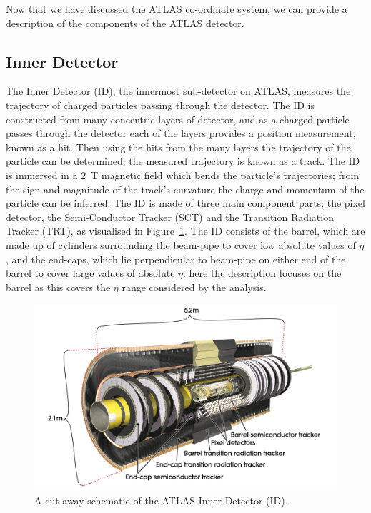Now that we have discussed the ATLAS co-ordinate system, we can provide a description of the components of the ATLAS detector.\\

\subsection{Inner Detector}
\label{sec:det-ID}

The Inner Detector (ID), the innermost sub-detector on ATLAS,
measures the trajectory of charged particles passing through the detector.
The ID is constructed from many concentric layers of detector,
and as a charged particle passes through the detector each of the layers provides a position measurement, known as a hit.
Then using the hits from the many layers the trajectory of the particle can be determined;
the measured trajectory is known as a track.
The ID is immersed in a 2~T magnetic field which bends the particle's trajectories;
from the sign and magnitude of the track's curvature the charge and momentum of the particle can be inferred.
The ID is made of three main component parts; the pixel detector, the Semi-Conductor Tracker
(SCT) and the Transition Radiation Tracker (TRT), as visualised in Figure~\ref{fig:det-ID_schem}.
The ID consists of the barrel, which are made up of cylinders surrounding the beam-pipe to cover low absolute values of $\eta$,
and the end-caps, which lie  perpendicular to beam-pipe on either end of the barrel to cover large values of absolute $\eta$:
here the description focuses on the barrel as this covers the $\eta$ range considered by the analysis.\\

\begin{figure}[!ht]
  \begin{center}
    \includegraphics[width=0.8\linewidth, angle=0]{figs/Detector/ID_schem.pdf}
  \end{center}
  \caption{
    A cut-away schematic of the ATLAS Inner Detector (ID).}
  \label{fig:det-ID_schem}
\end{figure}

